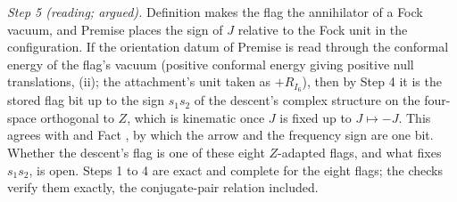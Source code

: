 \emph{Step 5 (reading; argued).} Definition  makes the flag the annihilator of a Fock vacuum, and Premise  places the sign of $J$ relative to the Fock unit in the configuration. If the orientation datum of Premise  is read through the conformal energy of the flag's vacuum (positive conformal energy giving positive null translations, (ii); the attachment's unit taken as $+R_{I_{6}}$), then by Step 4 it is the stored flag bit up to the sign $s_{1}s_{2}$ of the descent's complex structure on the four-space orthogonal to $Z$, which is kinematic once $J$ is fixed up to $J \mapsto -J$. This agrees with  and Fact , by which the arrow and the frequency sign are one bit. Whether the descent's flag is one of these eight $Z$-adapted flags, and what fixes $s_{1}s_{2}$, is open. Steps 1 to 4 are exact and complete for the eight flags; the checks verify them exactly, the conjugate-pair relation included.
